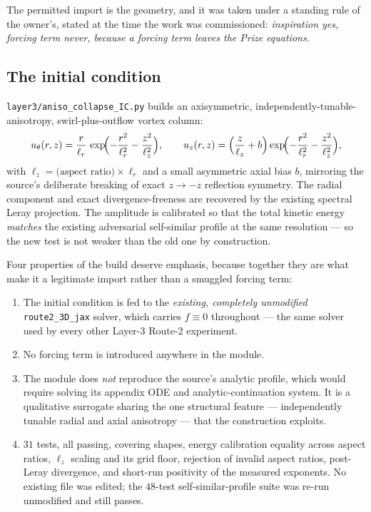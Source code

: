 The permitted import is the geometry, and it was taken under a standing rule
of the owner's, stated at the time the work was commissioned: \emph{inspiration
yes, forcing term never, because a forcing term leaves the Prize equations.}

\subsection{The initial condition}

\texttt{layer3/aniso\_collapse\_IC.py} builds an axisymmetric,
independently-tunable-anisotropy, swirl-plus-outflow vortex column:
\[
  u_\theta(r,z) = \frac{r}{\ell_r}\,
    \exp\!\Bigl(-\frac{r^2}{\ell_r^2}-\frac{z^2}{\ell_z^2}\Bigr),
  \qquad
  u_z(r,z) = \Bigl(\frac{z}{\ell_z}+b\Bigr)
    \exp\!\Bigl(-\frac{r^2}{\ell_r^2}-\frac{z^2}{\ell_z^2}\Bigr),
\]
with \(\ell_z=\text{(aspect ratio)}\times\ell_r\) and a small asymmetric axial
bias \(b\), mirroring the source's deliberate breaking of exact
\(z\to-z\) reflection symmetry. The radial component and exact
divergence-freeness are recovered by the existing spectral Leray projection.
The amplitude is calibrated so that the total kinetic energy \emph{matches} the
existing adversarial self-similar profile at the same resolution --- so the new
test is not weaker than the old one by construction.

Four properties of the build deserve emphasis, because together they are what
make it a legitimate import rather than a smuggled forcing term:

\begin{enumerate}[leftmargin=2.2em]
\item The initial condition is fed to the \emph{existing, completely
  unmodified} \texttt{route2\_3D\_jax} solver, which carries \(f\equiv0\)
  throughout --- the same solver used by every other Layer-3 Route-2
  experiment.
\item No forcing term is introduced anywhere in the module.
\item The module does \emph{not} reproduce the source's analytic profile,
  which would require solving its appendix ODE and analytic-continuation
  system. It is a qualitative surrogate sharing the one structural feature ---
  independently tunable radial and axial anisotropy --- that the construction
  exploits.
\item \(31\) tests, all passing, covering shapes, energy calibration equality
  across aspect ratios, \(\ell_z\) scaling and its grid floor, rejection of
  invalid aspect ratios, post-Leray divergence, and short-run positivity of
  the measured exponents. No existing file was edited; the \(48\)-test
  self-similar-profile suite was re-run unmodified and still passes.
\end{enumerate}

